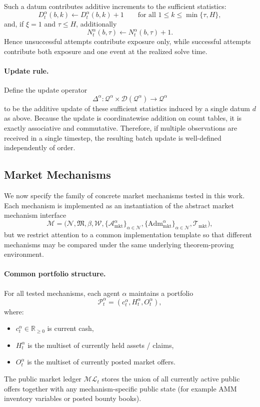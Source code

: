 Such a datum contributes additive increments to the sufficient statistics:
\[
D^\alpha_t(b,k) \leftarrow D^\alpha_t(b,k)+1
\qquad\text{for all }1\le k\le \min\{\tau,H\},
\]
and, if $\xi=1$ and $\tau\le H$, additionally
\[
N^\alpha_t(b,\tau) \leftarrow N^\alpha_t(b,\tau)+1.
\]
Hence unsuccessful attempts contribute exposure only, while successful attempts contribute both exposure and one event at the realized solve time.

\paragraph{Update rule.}
Define the update operator
\[
\Delta^\alpha : \mathcal Q^\alpha \times \mathcal D(\mathcal Q^\alpha)\to \mathcal Q^\alpha
\]
to be the additive update of these sufficient statistics induced by a single datum $d$ as above. Because the update is coordinatewise addition on count tables, it is exactly associative and commutative. Therefore, if multiple observations are received in a single timestep, the resulting batch update is well-defined independently of order.

\subsection{Market Mechanisms}

We now specify the family of concrete market mechanisms tested in this work. Each mechanism is implemented as an instantiation of the abstract market mechanism interface
\[
\mathscr M=\Big(\mathcal N,\mathfrak M,\beta,\mathcal W,\{\mathcal A^\alpha_{\mathrm{mkt}}\}_{\alpha\in\mathcal N},
\{\mathrm{Adm}^\alpha_{\mathrm{mkt}}\}_{\alpha\in\mathcal N},\mathcal T_{\mathrm{mkt}}\Big),
\]
but we restrict attention to a common implementation template so that different mechanisms may be compared under the same underlying theorem-proving environment.

\paragraph{Common portfolio structure.}
For all tested mechanisms, each agent $\alpha$ maintains a portfolio
\[
\mathcal P^\alpha_t=(c^\alpha_t,H^\alpha_t,O^\alpha_t),
\]
where:
\begin{itemize}
    \item $c^\alpha_t\in\mathbb R_{\ge 0}$ is current cash,
    \item $H^\alpha_t$ is the multiset of currently held assets / claims,
    \item $O^\alpha_t$ is the multiset of currently posted market offers.
\end{itemize}
The public market ledger $\mathcal{ML}_t$ stores the union of all currently active public offers together with any mechanism-specific public state (for example AMM inventory variables or posted bounty books).

